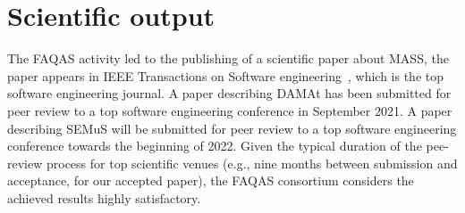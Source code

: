 
\chapter{Scientific output}

The FAQAS activity led to the publishing of a scientific paper about MASS, the paper appears in IEEE Transactions on Software engineering~\cite{Oscar:MASS:TSE}, which is the top software engineering journal.
A paper describing DAMAt has been submitted for peer review to a top software engineering conference in September 2021. A paper describing SEMuS will be submitted for peer review to a top software engineering conference towards the beginning of 2022. Given the typical duration of the pee-review process for top scientific venues (e.g., nine months between submission and acceptance, for our accepted paper), the FAQAS consortium considers the achieved results highly satisfactory.

